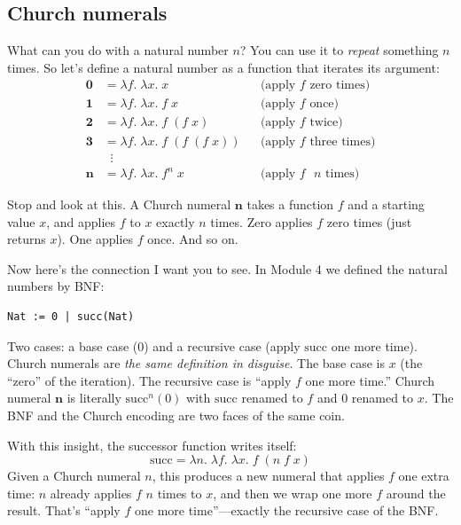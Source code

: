 \documentclass[11pt]{article}
\begin{document}
\subsection*{Church numerals}

What can you do with a natural number $n$? You can use it to \emph{repeat} something $n$ times. So let's define a natural number as a function that iterates its argument:
\begin{align*}
\mathbf{0} &= \lambda f.\; \lambda x.\; x              && \text{(apply $f$ zero times)} \\
\mathbf{1} &= \lambda f.\; \lambda x.\; f\; x           && \text{(apply $f$ once)} \\
\mathbf{2} &= \lambda f.\; \lambda x.\; f\;(f\; x)      && \text{(apply $f$ twice)} \\
\mathbf{3} &= \lambda f.\; \lambda x.\; f\;(f\;(f\; x)) && \text{(apply $f$ three times)} \\
    &\;\;\vdots \\
\mathbf{n} &= \lambda f.\; \lambda x.\; f^n\; x          && \text{(apply $f$ $n$ times)}
\end{align*}

Stop and look at this. A Church numeral $\mathbf{n}$ takes a function $f$ and a starting value $x$, and applies $f$ to $x$ exactly $n$ times. Zero applies $f$ zero times (just returns $x$). One applies $f$ once. And so on.

Now here's the connection I want you to see. In Module 4 we defined the natural numbers by BNF:

\begin{lstlisting}
Nat := 0 | succ(Nat)
\end{lstlisting}

Two cases: a base case ($0$) and a recursive case (apply $\text{succ}$ one more time). Church numerals are \emph{the same definition in disguise}. The base case is $x$ (the ``zero'' of the iteration). The recursive case is ``apply $f$ one more time.'' Church numeral $\mathbf{n}$ is literally $\text{succ}^n(0)$ with $\text{succ}$ renamed to $f$ and $0$ renamed to $x$. The BNF and the Church encoding are two faces of the same coin.

With this insight, the successor function writes itself:
\[
\text{succ} = \lambda n.\; \lambda f.\; \lambda x.\; f\;(n\; f\; x)
\]
Given a Church numeral $n$, this produces a new numeral that applies $f$ one extra time: $n$ already applies $f$ $n$ times to $x$, and then we wrap one more $f$ around the result. That's ``apply $f$ one more time''---exactly the recursive case of the BNF\@.
\end{document}
